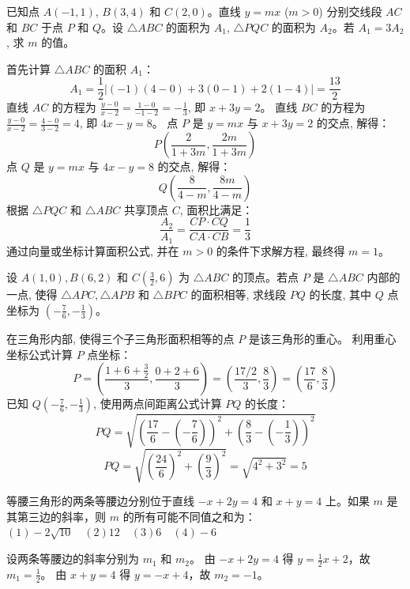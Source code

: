 \begin{questions}
\question
已知点 $A(-1, 1)$, $B(3, 4)$ 和 $C(2, 0)$。直线 $y = mx$ ($m > 0$) 分别交线段 $AC$ 和 $BC$ 于点 $P$ 和 $Q$。设 $\triangle ABC$ 的面积为 $A_1$, $\triangle PQC$ 的面积为 $A_2$。若 $A_1 = 3A_2$, 求 $m$ 的值。

\begin{solution}
首先计算 $\triangle ABC$ 的面积 $A_1$：
\[
A_1 = \frac{1}{2} |(-1)(4 - 0) + 3(0 - 1) + 2(1 - 4)| = \frac{13}{2}
\]
直线 $AC$ 的方程为 $\frac{y - 0}{x - 2} = \frac{1 - 0}{-1 - 2} = -\frac{1}{3}$, 即 $x + 3y = 2$。
直线 $BC$ 的方程为 $\frac{y - 0}{x - 2} = \frac{4 - 0}{3 - 2} = 4$, 即 $4x - y = 8$。
点 $P$ 是 $y = mx$ 与 $x + 3y = 2$ 的交点, 解得：
\[
P\left( \frac{2}{1 + 3m}, \frac{2m}{1 + 3m} \right)
\]
点 $Q$ 是 $y = mx$ 与 $4x - y = 8$ 的交点, 解得：
\[
Q\left( \frac{8}{4 - m}, \frac{8m}{4 - m} \right)
\]
根据 $\triangle PQC$ 和 $\triangle ABC$ 共享顶点 $C$, 面积比满足：
\[
\frac{A_2}{A_1} = \frac{CP \cdot CQ}{CA \cdot CB} = \frac{1}{3}
\]
通过向量或坐标计算面积公式, 并在 $m > 0$ 的条件下求解方程, 最终得 $m = 1$。
\end{solution}

\question
设 $A(1, 0), B(6, 2)$ 和 $C\left( \frac{3}{2}, 6 \right)$ 为 $\triangle ABC$ 的顶点。若点 $P$ 是 $\triangle ABC$ 内部的一点, 使得 $\triangle APC, \triangle APB$ 和 $\triangle BPC$ 的面积相等, 求线段 $PQ$ 的长度, 其中 $Q$ 点坐标为 $\left( -\frac{7}{6}, -\frac{1}{3} \right)$。

\begin{solution}
在三角形内部, 使得三个子三角形面积相等的点 $P$ 是该三角形的重心。
利用重心坐标公式计算 $P$ 点坐标：
\[
P = \left( \frac{1 + 6 + \frac{3}{2}}{3}, \frac{0 + 2 + 6}{3} \right) = \left( \frac{17/2}{3}, \frac{8}{3} \right) = \left( \frac{17}{6}, \frac{8}{3} \right)
\]
已知 $Q\left( -\frac{7}{6}, -\frac{1}{3} \right)$, 使用两点间距离公式计算 $PQ$ 的长度：
\[
PQ = \sqrt{\left( \frac{17}{6} - \left( -\frac{7}{6} \right) \right)^2 + \left( \frac{8}{3} - \left( -\frac{1}{3} \right) \right)^2}
\]
\[
PQ = \sqrt{\left( \frac{24}{6} \right)^2 + \left( \frac{9}{3} \right)^2} = \sqrt{4^2 + 3^2} = 5
\]
\end{solution}

\question
等腰三角形的两条等腰边分别位于直线 $-x + 2y = 4$ 和 $x + y = 4$ 上。如果 $m$ 是其第三边的斜率，则 $m$ 的所有可能不同值之和为：
$(1) -2\sqrt{10} \quad (2) 12 \quad (3) 6 \quad (4) -6
$
\begin{solution}
设两条等腰边的斜率分别为 $m_1$ 和 $m_2$。
由 $-x + 2y = 4$ 得 $y = \frac{1}{2}x + 2$，故 $m_1 = \frac{1}{2}$。
由 $x + y = 4$ 得 $y = -x + 4$，故 $m_2 = -1$。


\end{solution}
\end{questions}

